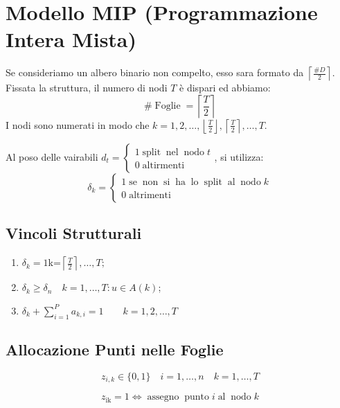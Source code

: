 \documentclass{article}
\newcommand{\tmop}[1]{\ensuremath{\operatorname{#1}}}
\begin{document}
\section{Modello MIP (Programmazione Intera Mista)}

Se consideriamo un albero binario non compelto, esso sara formato da
$\left\lceil \frac{\#D}{2} \right\rceil$. Fissata la struttura, il numero di
nodi $T$ {\`e} dispari ed abbiamo:
\[ \# \tmop{Foglie} = \left\lceil \frac{T}{2} \right\rceil \]
I nodi sono numerati in modo che $k = 1, 2, \ldots, \left\lfloor \frac{T}{2}
\right\rfloor, \left\lceil \frac{T}{2} \right\rceil, \ldots, T$.

Al poso delle vairabili $d_t = \left\{\begin{array}{l}
  1 \tmop{split} \tmop{nel} \tmop{nodo} t\\
  0 \tmop{altirmenti}
\end{array}\right.$, si utilizza:
\[ \delta_k = \left\{\begin{array}{l}
     1 \tmop{se} \tmop{non} \tmop{si} \tmop{ha} \tmop{lo} \tmop{split}
     \tmop{al} \tmop{nodo} k\\
     0 \tmop{altrimenti}
   \end{array}\right. \]

\subsection{Vincoli Strutturali}

\begin{enumerate}
  \item $\delta_k = 1$\quad k=$\left\lceil \frac{T}{2} \right\rceil, \ldots, T
  ;$
  
  \item $\delta_k \geqslant \delta_n \quad k = 1, \ldots, T : u \in A (k)$;
  
  \item $\delta_k + \sum_{i = 1}^P a_{k, i} = 1 \qquad k = 1, 2, \ldots, T$
\end{enumerate}

\subsection{Allocazione Punti nelle Foglie}

\[ z_{i, k} \in \{ 0, 1 \} \quad i = 1, \ldots, n \quad k = 1, \ldots, T \]
\begin{remark}
  \[ z_{\tmop{ik}} = 1 \Longleftrightarrow \tmop{assegno} \tmop{punto} i
     \tmop{al} \tmop{nodo} k \]
\end{remark}
\end{document}
